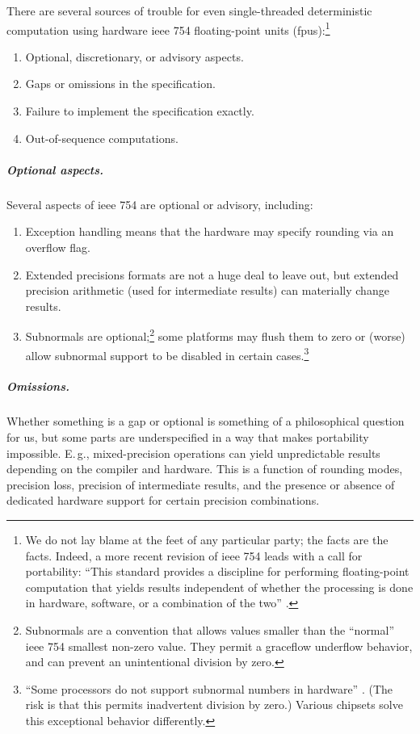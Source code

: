 \documentclass[twoside]{article}
\begin{document}
There are several sources of trouble for even single-threaded deterministic computation using hardware {\sc ieee} 754 floating-point units ({\sc fpu}s):\footnote{We do not lay blame at the feet of any particular party; the facts are the facts.  Indeed, a more recent revision of {\sc ieee} 754 leads with a call for portability:  “This standard provides a discipline for performing floating-point computation that yields results independent of whether the processing is done in hardware, software, or a combination of the two” \citep{IEEE754-2008}.}

\begin{enumerate}
  \item  Optional, discretionary, or advisory aspects.
  \item  Gaps or omissions in the specification.
  \item  Failure to implement the specification exactly.
  \item  Out-of-sequence computations.
\end{enumerate}

\subparagraph{Optional aspects.}

Several aspects of {\sc ieee} 754 are optional or advisory, including:

\begin{enumerate}
  \item  Exception handling means that the hardware may specify rounding via an overflow flag.
  \item  Extended precisions formats are not a huge deal to leave out, but extended precision arithmetic (used for intermediate results) can materially change results.
  \item  \sloppy Subnormals are optional;\footnote{Subnormals are a convention that allows values smaller than the “normal” {\sc ieee} 754 smallest non-zero value.  They permit a graceflow underflow behavior, and can prevent an unintentional division by zero.} some platforms may flush them to zero or (worse) allow subnormal support to be disabled in certain cases.\footnote{“Some processors do not support subnormal numbers in hardware” \citetext{\citet{Jones2008}, p.~338}.  (The risk is that this permits inadvertent division by zero.)  Various chipsets solve this exceptional behavior differently.}
\end{enumerate}

\subparagraph{Omissions.}

Whether something is a gap or optional is something of a philosophical question for us, but some parts are underspecified in a way that makes portability impossible.  E.\,g., mixed-precision operations can yield unpredictable results depending on the compiler and hardware.  This is a function of rounding modes, precision loss, precision of intermediate results, and the presence or absence of dedicated hardware support for certain precision combinations.
\end{document}
